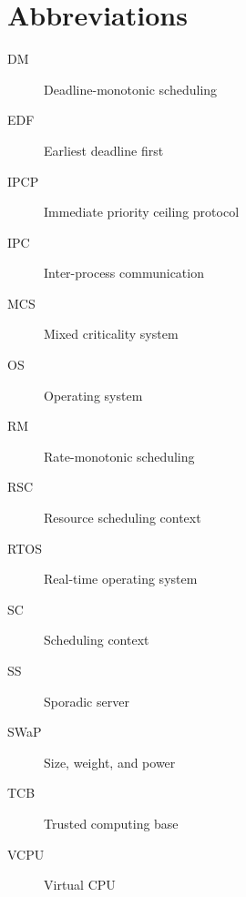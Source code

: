 \chapter*{Abbreviations}\label{abbr}

\begin{description}
\item[DM] Deadline-monotonic scheduling
\item[EDF] Earliest deadline first
\item[IPCP] Immediate priority ceiling protocol
\item[IPC] Inter-process communication
\item[MCS] Mixed criticality system
\item[OS] Operating system
\item[RM] Rate-monotonic scheduling
\item[RSC] Resource scheduling context
\item[RTOS] Real-time operating system
\item[SC] Scheduling context
\item[SS] Sporadic server
\item[SWaP] Size, weight, and power
\item[TCB] Trusted computing base
\item[VCPU] Virtual CPU
\end{description}
